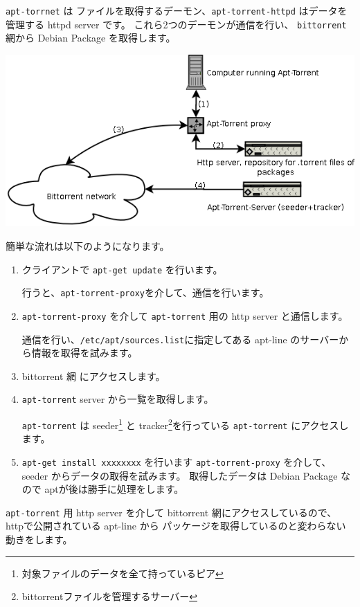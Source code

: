\documentclass[mingoth,a4paper]{jsarticle}
\begin{document}
\texttt{apt-torrnet} は ファイルを取得するデーモン、\texttt{apt-torrent-httpd} はデータを管理する httpd server です。
これら2つのデーモンが通信を行い、 \texttt{bittorrent}網から Debian Package を取得します。

\includegraphics[width=15cm]{image200701/apt-torrent00.png}

簡単な流れは以下のようになります。
\begin{enumerate}
	\item クライアントで \texttt{apt-get update} を行います。

		行うと、\texttt{apt-torrent-proxy}を介して、通信を行います。

	\item \texttt{apt-torrent-proxy} を介して \texttt{apt-torrent} 用の http server と通信します。

		通信を行い、\texttt{/etc/apt/sources.list}に指定してある apt-line のサーバーから情報を取得を試みます。
	\item bittorrent 網 にアクセスします。
	
	\item \texttt{apt-torrent} server から一覧を取得します。

		\texttt{apt-torrent} は seeder\footnote{対象ファイルのデータを全て持っているピア} と 
		tracker\footnote{bittorrentファイルを管理するサーバー}を行っている \texttt{apt-torrent} にアクセスします。
	
	\item \texttt{apt-get install xxxxxxxx} を行います
		\texttt{apt-torrent-proxy} を介して、seeder からデータの取得を試みます。
		取得したデータは Debian Package なので aptが後は勝手に処理をします。
 	
\end{enumerate}

\texttt{apt-torrent} 用 http server を介して bittorrent 網にアクセスしているので、httpで公開されている apt-line から
パッケージを取得しているのと変わらない動きをします。
\end{document}
